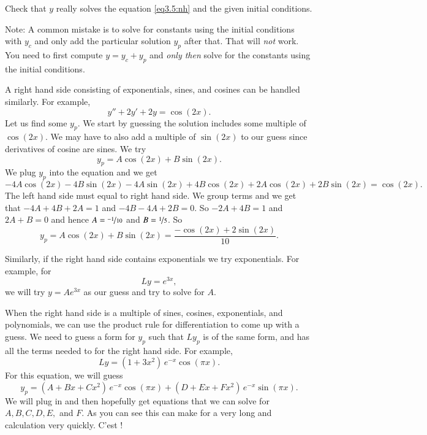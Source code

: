 \documentclass[12pt]{book}
\begin{document}
\begin{exercise}
Check that $y$ really solves the equation \eqref{eq3.5:nh}
and the given initial conditions.
\end{exercise}

Note: A common mistake is to solve for constants using the initial
conditions with $y_c$ and only add the particular solution $y_p$ after that.
That will \emph{not} work.  You need to first compute $y = y_c + y_p$ and
\emph{only then} solve for the constants using the initial conditions.

\medskip

A right hand side consisting of exponentials, sines, and cosines
can be handled similarly.  For example,
\begin{equation*}
y''+2y'+2y = \cos (2x) .
\end{equation*}
Let us find some $y_p$.  We start by guessing the solution
includes some multiple of $\cos(2x)$.
We may have to also
add a multiple of $\sin (2x)$ to our guess since derivatives of cosine are
sines.  We try
\begin{equation*}
y_p = A \cos (2x) + B \sin (2x) .
\end{equation*}
We plug $y_p$ into the equation and we get
\begin{equation*}
-4 A \cos (2x) - 4 B \sin (2x) 
-4A \sin (2x) + 4B \cos (2x)
+ 2A \cos (2x) + 2B \sin (2x)
= \cos (2x) .
\end{equation*}
The left hand side must equal to right hand side.  We group terms and
we get that $-4A + 4B + 2A = 1$ and
$-4B - 4A + 2B = 0$.  So $-2A+4B =1$ and $2A+B=0$ and hence
$A=\nicefrac{-1}{10}$ and $B=\nicefrac{1}{5}$.  So
\begin{equation*}
y_p = A \cos (2x) + B \sin (2x) = \frac{-\cos (2x) + 2 \sin (2x)}{10} .
\end{equation*}

Similarly, if the right hand side contains exponentials we try
exponentials.  For example, for
\begin{equation*}
Ly = e^{3x},
\end{equation*}
we will try $y = A e^{3x}$ as our guess and try to solve for $A$.

\medskip

When the right hand side is a multiple of sines, cosines, exponentials,
and polynomials, we can use the product rule
for differentiation to come up with a guess.  We
need to guess a
form for $y_p$ such that $Ly_p$ is of the same form, and 
has all the terms needed to for 
the right hand side.
For example,
\begin{equation*}
Ly = (1+3x^2)\,e^{-x}\cos (\pi x) .
\end{equation*}
For this equation, we will guess
\begin{equation*}
y_p = (A + Bx + Cx^2)\,e^{-x} \cos (\pi x) + 
(D + Ex + Fx^2)\,e^{-x} \sin (\pi x) .
\end{equation*}
We will plug in and then hopefully get equations that we can solve for
$A,B,C,D,E,$ and $F$.  As you can see this can make for a very long and
calculation very quickly.  C'est ! %
\end{document}
